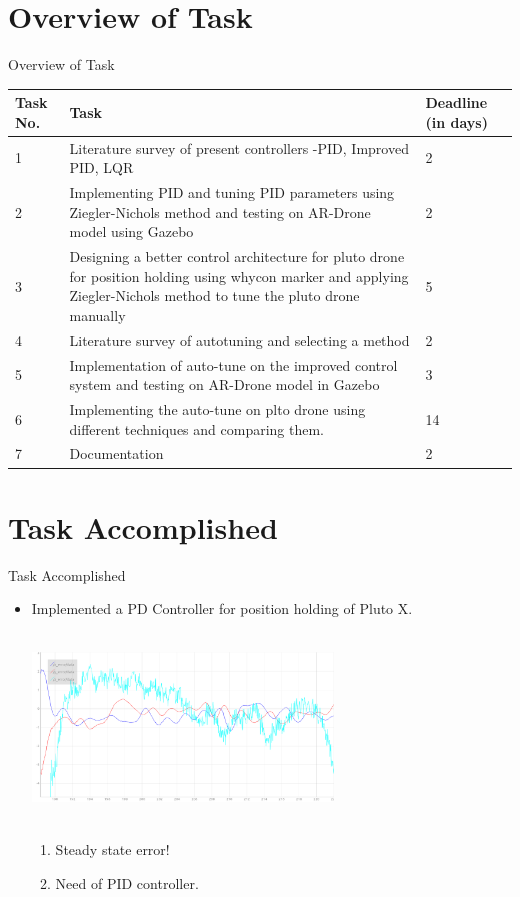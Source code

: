\documentclass[10pt, a4paper]{beamer}
\begin{document}
\section{Overview of Task}
\begin{frame}{Overview of Task}
	\begin{tabular}{|p{1.7em}|p{20em}|p{5em}|}\hline
		\textbf{Task No.} & \textbf{Task} & \textbf{Deadline (in days)}\\\hline
		1 & \small{Literature survey of present controllers -PID, Improved PID, LQR} & 2\\\hline
			2 &\small{Implementing PID and tuning PID parameters using Ziegler-Nichols method and testing on AR-Drone model using Gazebo}& 2\\\hline
3 &\small{ Designing a better control architecture for pluto drone for position holding using whycon marker and applying Ziegler-Nichols method to tune the pluto drone manually }& 5\\\hline
4 &\small{ Literature survey of autotuning and selecting a method }& 2\\\hline
	5 &\small{ Implementation of auto-tune on the improved control system and testing on AR-Drone model in Gazebo}& 3\\\hline
6 &\small{ Implementing the auto-tune on plto drone using different techniques and comparing them. }& 14\\\hline
	7 &\small{ Documentation }& 2\\\hline			 
		
	
	\end{tabular}
\end{frame}

\section{Task Accomplished}
\begin{frame}{Task Accomplished}
	\begin{itemize}
		\item Implemented a PD Controller for position holding of Pluto X. \vspace{1em}
		
		
		\includegraphics[width= 8cm , height=5cm]{auto-tuned-response.png}
		\begin{enumerate}
		    \vspace{1em}\item Steady state error!\vspace{1em}
		   \item Need of PID controller.\vspace{1em}
		\end{enumerate}
	    \end{itemize}
		\end{frame}
		
\end{document}
